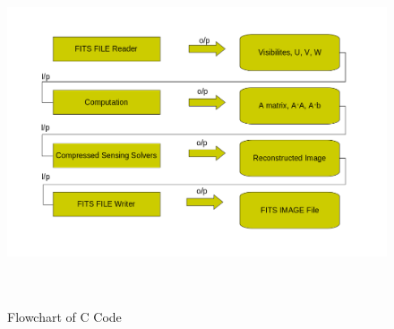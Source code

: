 \begin{figure}[!htbp]
  \begin{center}
      \includegraphics[width=6.1in,height=4in]{figures/flow}
    \caption{Flowchart of C Code}
    \label{Figflow}
  \end{center}
\end{figure}
